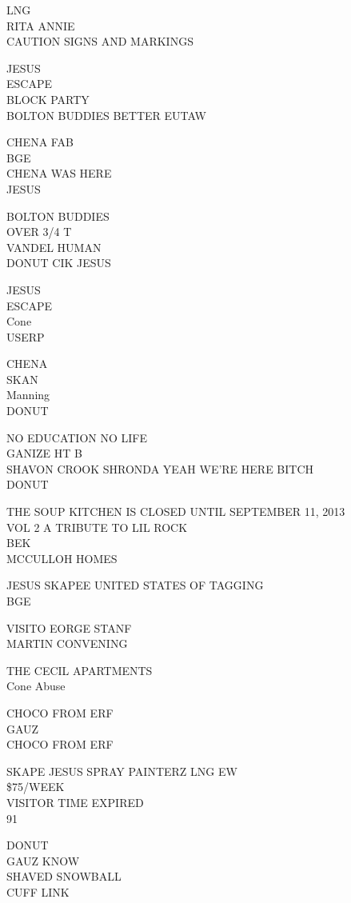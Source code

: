 \documentclass[10pt,letterpaper]{article}
\begin{document}
LNG\\
RITA ANNIE\\
CAUTION SIGNS AND MARKINGS

JESUS\\
ESCAPE\\
BLOCK PARTY\\
BOLTON BUDDIES BETTER EUTAW

CHENA FAB\\
BGE\\
CHENA WAS HERE\\
JESUS

BOLTON BUDDIES\\
OVER 3/4 T\\
VANDEL HUMAN\\
DONUT CIK JESUS

JESUS\\
ESCAPE\\
Cone\\
USERP

CHENA\\
SKAN\\
Manning\\
DONUT

NO EDUCATION NO LIFE\\
GANIZE HT B\\
SHAVON CROOK SHRONDA YEAH WE'RE HERE BITCH\\
DONUT

THE SOUP KITCHEN IS CLOSED UNTIL SEPTEMBER 11, 2013\\
VOL 2 A TRIBUTE TO LIL ROCK\\
BEK\\
MCCULLOH HOMES

JESUS SKAPEE UNITED STATES OF TAGGING\\
BGE

VISITO EORGE STANF\\
MARTIN CONVENING

THE CECIL APARTMENTS\\
Cone Abuse

CHOCO FROM ERF\\
GAUZ\\
CHOCO FROM ERF

SKAPE JESUS SPRAY PAINTERZ LNG EW\\
\$75/WEEK\\
VISITOR TIME EXPIRED\\
91

DONUT\\
GAUZ KNOW\\
SHAVED SNOWBALL\\
CUFF LINK
\end{document}
